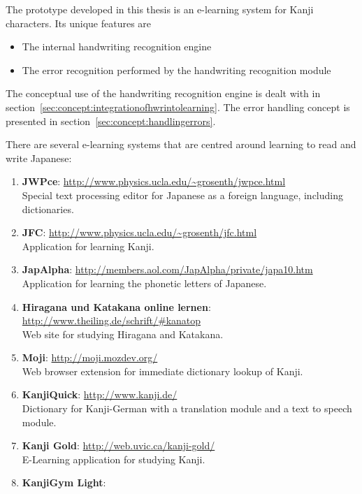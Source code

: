 The prototype developed in this thesis is an e-learning system for Kanji 
characters. Its unique features are
\begin{itemize}
  \item The internal handwriting recognition engine
  \item The error recognition performed by the handwriting recognition module
\end{itemize}

The conceptual use of the handwriting recognition engine is dealt with in 
section~\ref{sec:concept:integrationofhwrintolearning}. The error handling 
concept is presented in section~\ref{sec:concept:handlingerrors}.

There are several e-learning systems that are centred around learning to read 
and write Japanese:
\begin{enumerate}
    \item \textbf{JWPce}:
          \url{http://www.physics.ucla.edu/~grosenth/jwpce.html} \\
          Special text processing editor for Japanese as a foreign language,
          including dictionaries.
    \item \textbf{JFC}:
          \url{http://www.physics.ucla.edu/~grosenth/jfc.html} \\
          Application for learning Kanji.
    \item \textbf{JapAlpha}:
          \url{http://members.aol.com/JapAlpha/private/japa10.htm } \\
          Application for learning the phonetic letters of Japanese.
    \item \textbf{Hiragana und Katakana online lernen}:
          \url{http://www.theiling.de/schrift/#kanatop} \\
          Web site for studying Hiragana and Katakana.
    \item \textbf{Moji}:
          \url{http://moji.mozdev.org/} \\
          Web browser extension for immediate dictionary lookup of Kanji.
    \item \textbf{KanjiQuick}:
          \url{http://www.kanji.de/} \\
          Dictionary for Kanji-German with a translation module and a text to 
          speech module.
    \item \textbf{Kanji Gold}:
          \url{http://web.uvic.ca/kanji-gold/} \\
          E-Learning application for studying Kanji.
    \item \textbf{KanjiGym Light}: \label{concept:kanjigymlight}

\end{enumerate}
